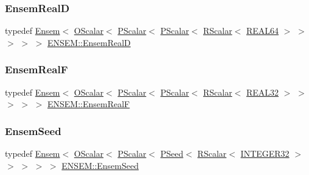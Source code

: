 \mbox{\label{group__defs_gaabc6e707d8e7066c144fa8f9fa002f2e}} 
\subsubsection{\texorpdfstring{EnsemRealD}{EnsemRealD}}
{\footnotesize\ttfamily typedef \mbox{\hyperlink{classENSEM_1_1Ensem}{Ensem}}$<$ \mbox{\hyperlink{classENSEM_1_1OScalar}{O\+Scalar}}$<$ \mbox{\hyperlink{classENSEM_1_1PScalar}{P\+Scalar}}$<$ \mbox{\hyperlink{classENSEM_1_1PScalar}{P\+Scalar}}$<$ \mbox{\hyperlink{classENSEM_1_1RScalar}{R\+Scalar}}$<$ \mbox{\hyperlink{namespaceENSEM_a85b215b9f1f43715aebee01718e25082}{R\+E\+A\+L64}} $>$ $>$ $>$ $>$ $>$ \mbox{\hyperlink{group__defs_gaabc6e707d8e7066c144fa8f9fa002f2e}{E\+N\+S\+E\+M\+::\+Ensem\+RealD}}}

\mbox{\label{group__defs_gab272a08b4cb02e4fae683911645bd3e1}} 
\subsubsection{\texorpdfstring{EnsemRealF}{EnsemRealF}}
{\footnotesize\ttfamily typedef \mbox{\hyperlink{classENSEM_1_1Ensem}{Ensem}}$<$ \mbox{\hyperlink{classENSEM_1_1OScalar}{O\+Scalar}}$<$ \mbox{\hyperlink{classENSEM_1_1PScalar}{P\+Scalar}}$<$ \mbox{\hyperlink{classENSEM_1_1PScalar}{P\+Scalar}}$<$ \mbox{\hyperlink{classENSEM_1_1RScalar}{R\+Scalar}}$<$ \mbox{\hyperlink{namespaceENSEM_a7540d01191172323e9073283d772576d}{R\+E\+A\+L32}} $>$ $>$ $>$ $>$ $>$ \mbox{\hyperlink{group__defs_gab272a08b4cb02e4fae683911645bd3e1}{E\+N\+S\+E\+M\+::\+Ensem\+RealF}}}

\mbox{\label{group__defs_ga698c2e3c5bf93dd51c61ca1234372463}} 
\subsubsection{\texorpdfstring{EnsemSeed}{EnsemSeed}}
{\footnotesize\ttfamily typedef \mbox{\hyperlink{classENSEM_1_1Ensem}{Ensem}}$<$ \mbox{\hyperlink{classENSEM_1_1OScalar}{O\+Scalar}}$<$ \mbox{\hyperlink{classENSEM_1_1PScalar}{P\+Scalar}}$<$ \mbox{\hyperlink{classENSEM_1_1PSeed}{P\+Seed}}$<$ \mbox{\hyperlink{classENSEM_1_1RScalar}{R\+Scalar}}$<$ \mbox{\hyperlink{namespaceENSEM_a6a58e5c07422c48c5d547184b36719bf}{I\+N\+T\+E\+G\+E\+R32}} $>$ $>$ $>$ $>$ $>$ \mbox{\hyperlink{group__defs_ga698c2e3c5bf93dd51c61ca1234372463}{E\+N\+S\+E\+M\+::\+Ensem\+Seed}}}

